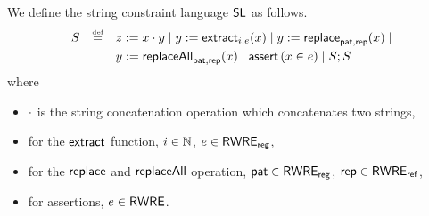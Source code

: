 We define the string constraint language $\mathsf{SL}$ %
as follows. 
\[
\begin{array}{l c l}
\smallskip
S & \eqdef  & z:= x \concat y \mid y := \extract_{i, e}(x) \mid  
y := \replace_{\pat, \rep}(x) \mid \\
& & y := \replaceall_{\pat, \rep}(x)   \mid 
 \ASSERT{x \in e} \mid S; S\
\label{eq:SL}
\end{array}
\]
where 
\begin{itemize}
	\item $\cdot$ is the string concatenation operation which concatenates two strings,
%
\item for the $\mathsf{extract}$ function, $i \in \mathbb{N}$, $e \in {\sf RWRE_{reg}}$,
%
	\item  for the $\mathsf{replace}$ and $\mathsf{replaceAll}$ operation, $\mathsf{pat}\in {\sf RWRE_{reg}}$, $\mathsf{rep} \in {\sf RWRE_{ref}}$, %
%
	\item for assertions, $e \in {\sf RWRE}$.
\end{itemize} 
%
%


%

